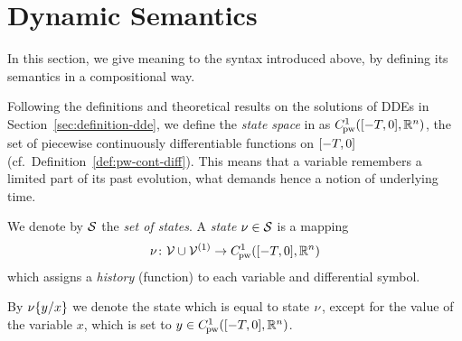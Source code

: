 \section{Dynamic Semantics}
    \label{sec:dynamic-semantics}


    In this section, we give meaning to the syntax introduced above, by defining its semantics in a compositional way.

    Following the definitions and theoretical results on the solutions of  DDEs in Section~\ref{sec:definition-dde}, we define the \emph{state space} in \ddL as $\statespace$, the set of piecewise continuously differentiable functions on $\closeddelayinterval$ (cf.\ Definition~\ref{def:pw-cont-diff}).
    This means that a variable remembers a limited part of its past evolution, what demands hence a notion of underlying time.

    We denote by $\states$ the \emph{set of states}. A \emph{state} $\asstate\in\states$ is a mapping
    \begin{equation}
        \asstate \from \allvars\cup\diffvars \to \statespace
    \end{equation}
    which assigns a \emph{history} (function) to each variable and differential symbol.

    By $\modif{\asstate}{x}{y}$ we denote the state which is equal to state $\asstate$, except for the value of the variable $x$, which is set to $y\in\statespace$.




